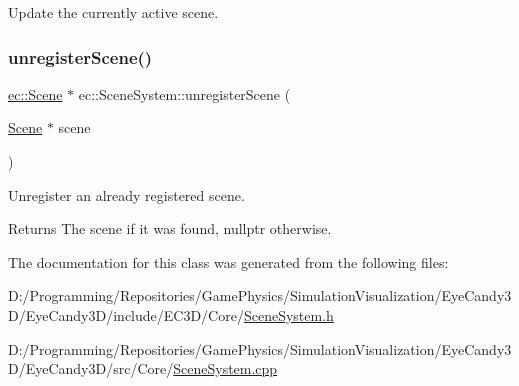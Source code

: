 Update the currently active scene. 

\mbox{\label{classec_1_1_scene_system_ae00450951bc3220dd9899d75bdd207c4}} 
\subsubsection{\texorpdfstring{unregister\+Scene()}{unregisterScene()}}
{\footnotesize\ttfamily \mbox{\hyperlink{classec_1_1_scene}{ec\+::\+Scene}} $\ast$ ec\+::\+Scene\+System\+::unregister\+Scene (\begin{DoxyParamCaption}\item[{\mbox{\hyperlink{classec_1_1_scene}{Scene}} $\ast$}]{scene }\end{DoxyParamCaption})}



Unregister an already registered scene. 

\begin{DoxyReturn}{Returns}
The scene if it was found, nullptr otherwise. 
\end{DoxyReturn}


The documentation for this class was generated from the following files\+:\begin{DoxyCompactItemize}
\item 
D\+:/\+Programming/\+Repositories/\+Game\+Physics/\+Simulation\+Visualization/\+Eye\+Candy3\+D/\+Eye\+Candy3\+D/include/\+E\+C3\+D/\+Core/\mbox{\hyperlink{_scene_system_8h}{Scene\+System.\+h}}\item 
D\+:/\+Programming/\+Repositories/\+Game\+Physics/\+Simulation\+Visualization/\+Eye\+Candy3\+D/\+Eye\+Candy3\+D/src/\+Core/\mbox{\hyperlink{_scene_system_8cpp}{Scene\+System.\+cpp}}\end{DoxyCompactItemize}
